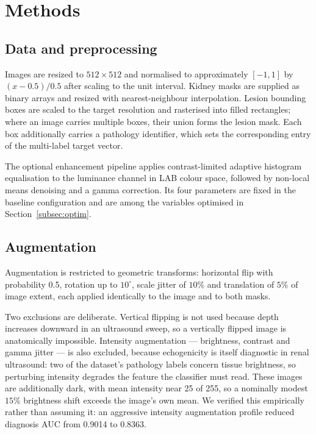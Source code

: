 \documentclass[pdflatex,sn-mathphys-num]{sn-jnl}
\theoremstyle{thmstyleone}%
\theoremstyle{thmstyletwo}%
\theoremstyle{thmstylethree}%
\begin{document}
\section{Methods}\label{sec:methods}

\subsection{Data and preprocessing}\label{subsec:preprocessing}

Images are resized to $512 \times 512$ and normalised to approximately $[-1, 1]$ by
$(x - 0.5)/0.5$ after scaling to the unit interval. Kidney masks are supplied as binary arrays
and resized with nearest-neighbour interpolation. Lesion bounding boxes are scaled to the target
resolution and rasterised into filled rectangles; where an image carries multiple boxes, their
union forms the lesion mask. Each box additionally carries a pathology identifier, which sets
the corresponding entry of the multi-label target vector.

The optional enhancement pipeline applies contrast-limited adaptive histogram equalisation
\cite{bib_clahe} to the luminance channel in LAB colour space, followed by non-local means
denoising \cite{bib_nlm} and a gamma correction. Its four parameters are fixed in
the baseline configuration and are among the variables optimised in
Section~\ref{subsec:optim}.

\subsection{Augmentation}\label{subsec:augmentation}

Augmentation is restricted to geometric transforms: horizontal flip with probability 0.5,
rotation up to $10^\circ$, scale jitter of $10\%$ and translation of $5\%$ of image extent, each
applied identically to the image and to both masks.

Two exclusions are deliberate. Vertical flipping is not used because depth increases downward in
an ultrasound sweep, so a vertically flipped image is anatomically impossible. Intensity
augmentation --- brightness, contrast and gamma jitter --- is also excluded, because
echogenicity is itself diagnostic in renal ultrasound: two of the dataset's pathology labels
concern tissue brightness, so perturbing intensity degrades the feature the classifier must
read. These images are additionally dark, with mean intensity near 25 of 255, so a nominally
modest $15\%$ brightness shift exceeds the image's own mean. We verified this empirically rather
than assuming it: an aggressive intensity augmentation profile reduced diagnosis AUC from 0.9014
to 0.8363.
\end{document}
